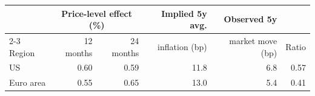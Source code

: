 \begin{tabular}{lrrrrr}
\toprule
 & \multicolumn{2}{c}{Price-level effect (\%)} & Implied 5y avg. & Observed 5y & \\ \cmidrule(lr){2-3}
Region & 12 months & 24 months & inflation (bp) & market move (bp) & Ratio\\
\midrule
US & 0.60 & 0.59 & 11.8 & 6.8 & 0.57\\
Euro area & 0.55 & 0.65 & 13.0 & 5.4 & 0.41\\
\bottomrule
\end{tabular}
